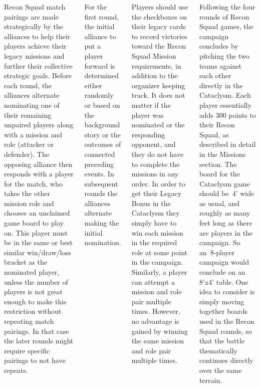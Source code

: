 \begin{columns}

Recon Squad match pairings are made strategically by the alliances to
help their players achieve their legacy missions and further their
collective strategic goals.  Before each round, the alliances
alternate nominating one of their remaining unpaired players along
with a mission and role (attacker or defender).  The opposing alliance
then responds with a player for the match, who takes the other mission
role and chooses an unclaimed game board to play on.  This player must
be in the same or best similar win/draw/loss bracket as the nominated
player, unless the number of players is not great enough to make this
restriction without repeating match pairings.  In that case the later
rounds might require specific pairings to not have repeats.

For the first round, the initial alliance to put a player forward is
determined either randomly or based on the background story or the
outcomes of connected preceding events.  In subsequent rounds the
alliances alternate making the initial nomination.

Players should use the checkboxes on their legacy cards to record
victories toward the Recon Squad Mission requirements, in addition to
the organizer keeping track.  It does not matter if the player was
nominated or the responding opponent, and they do not have to complete
the missions in any order.  In order to get their Legacy Bonus in the
Cataclysm they simply have to win each mission in the required role at
some point in the campaign.  Similarly, a player can attempt a mission
and role pair multiple times.  However, no advantage is gained by
winning the same mission and role pair multiple times.


Following the four rounds of Recon Squad games, the campaign concludes
by pitching the two teams against each other directly in the
Cataclysm.  Each player essentially adds 300 points to their Recon
Squad, as described in detail in the Missions section.  The board for
the Cataclysm game should be~4' wide as usual, and roughly as many
feet long as there are players in the campaign.  So an~8-player
campaign would conclude on an 8'x4' table.  One idea to consider is
simply moving together boards used in the Recon Squad rounds, so that
the battle thematically continues directly over the same terrain.



\end{columns}
